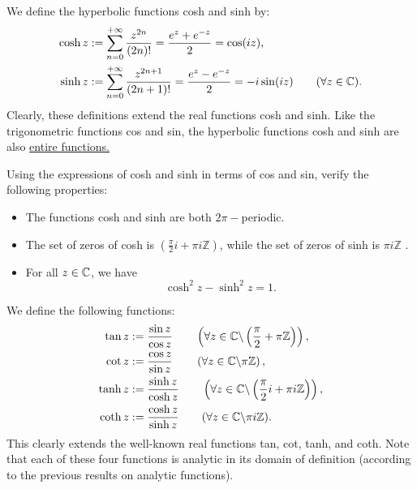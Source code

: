 \begin{definition}
  We define the hyperbolic functions cosh and sinh by: 
  \begin{align*}
    \cosh z &:= 
    \sum_{n=0}^{+\infty} \frac{z^{2n}}{(2n) !} 
    = \frac{e^{z} + e^{-z}}{2} = \cos (iz) , \\
    \sinh z &:=
    \sum_{n=0}^{+\infty} \frac{z^{2n+1}}{(2n+1) !} =
    \frac{e^{z} - e^{-z}}{2} = - i \sin (iz)  \quad \quad 
    (\forall z \in   \mathbb{C} ).
  \end{align*}
  Clearly, these definitions extend the real functions cosh and sinh. Like the trigonometric functions
  cos and sin, the hyperbolic functions cosh and sinh are also \underline{entire functions.}
\end{definition}
\exercise
Using the expressions of cosh and sinh in terms of cos and sin, verify the following properties:
\begin{itemize}
  \item[\ding{172}] The functions cosh and sinh are both $2\pi-$periodic.
   \item[\ding{173}] The set of zeros of cosh is 
     $(\frac{\pi }{2}i + \pi i \mathbb{Z})$, while the set of zeros of sinh is $\pi  i \mathbb{Z} $ .
    \item[\ding{174}] For all $z \in  \mathbb{C}  $, we have
      \[
        \cosh ^2 z - \sinh ^2  z = 1.
      \]
\end{itemize}
\begin{definition}
  We define the following functions:
  \begin{align*}
    \tan z &:= \frac{\sin z  }{\cos z  } \quad \quad 
    \left( 
    \forall z \in  \mathbb{C} \backslash 
    \left( 
   \frac{\pi }{2} + \pi \mathbb{Z} 
    \right) 
    \right),
    \\
    \cot z  &:= \frac{\cos  z}{\sin z  } \quad \quad 
    \left( 
    \forall z \in  \mathbb{C} \backslash \pi  \mathbb{Z} 
    \right),
    \\
    \tanh z &:= \frac{\sinh z  }{\cosh z  }   \quad \quad 
    \left( 
    \forall z \in   \mathbb{C} \backslash 
      \left( 
    \frac{\pi }{2} i + 
    \pi i \mathbb{Z}
      \right) 
    \right), 
    \\
    \coth z &:= \frac{\cosh z  }{\sinh z  }\quad \quad (\forall z \in  \mathbb{C}  \backslash  \pi  i \mathbb{Z}) .
  \end{align*}
  This clearly extends the well-known real functions tan, cot, tanh, and coth. Note that each of these four functions
  is analytic in its domain of definition (according to the previous results on analytic functions).
\end{definition}
